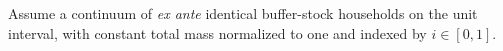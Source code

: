 \documentclass[BufferStockTheory]{subfiles}
\begin{document}



Assume a continuum of \textit{ex ante} identical buffer-stock households on the unit interval, with constant total mass normalized to one and indexed by $i \in [0,1]$.%
\end{document}
